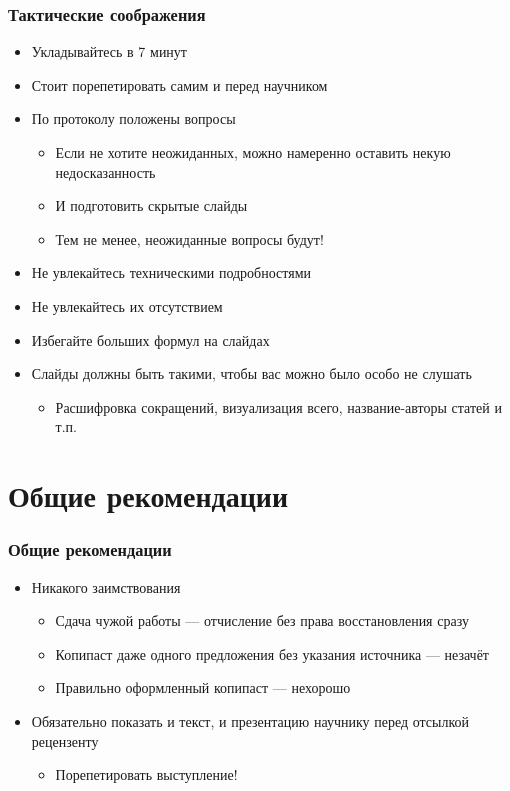 \documentclass[xetex,mathserif,serif]{beamer}
\begin{document}
    \begin{frame}
        \frametitle{Тактические соображения}
        \begin{itemize}
            \item Укладывайтесь в 7 минут
            \item Стоит порепетировать самим и перед научником
            \item По протоколу положены вопросы
            \begin{itemize}
                \item Если не хотите неожиданных, можно намеренно оставить некую недосказанность
                \item И подготовить скрытые слайды
                \item Тем не менее, неожиданные вопросы будут!
            \end{itemize}
            \item Не увлекайтесь техническими подробностями
            \item Не увлекайтесь их отсутствием
            \item Избегайте больших формул на слайдах
            \item Слайды должны быть такими, чтобы вас можно было особо не слушать
            \begin{itemize}
                \item Расшифровка сокращений, визуализация всего, название-авторы статей и т.п.
            \end{itemize}
        \end{itemize}
    \end{frame}

    \section{Общие рекомендации}

    \begin{frame}
        \frametitle{Общие рекомендации}
        \begin{itemize}
            \item Никакого заимствования 
            \begin{itemize}
                \item Сдача чужой работы --- отчисление без права восстановления сразу
                \item Копипаст даже одного предложения без указания источника --- незачёт
                \item Правильно оформленный копипаст --- нехорошо
            \end{itemize}
            \item Обязательно показать и текст, и презентацию научнику перед отсылкой рецензенту
            \begin{itemize}
                \item Порепетировать выступление!
            \end{itemize}
        \end{itemize}
    \end{frame}
\end{document}
